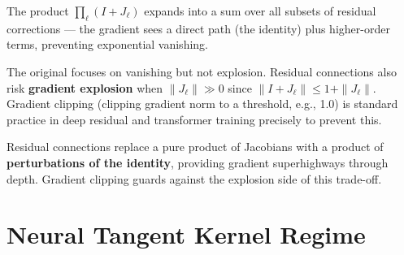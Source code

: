 \documentclass[12pt,a4paper]{article}
\theoremstyle{definition}
\theoremstyle{remark}
\begin{document}
The product $\prod_\ell(I + J_\ell)$ expands into a sum over all subsets of residual corrections — the gradient sees a direct path (the identity) plus higher-order terms, preventing exponential vanishing.

\begin{critbox}
The original focuses on vanishing but not explosion. Residual connections also risk \textbf{gradient explosion} when $\|J_\ell\| \gg 0$ since $\|I + J_\ell\| \le 1 + \|J_\ell\|$. Gradient clipping (clipping gradient norm to a threshold, e.g., 1.0) is standard practice in deep residual and transformer training precisely to prevent this.
\end{critbox}

\begin{keybox}
Residual connections replace a pure product of Jacobians with a product of \textbf{perturbations of the identity}, providing gradient superhighways through depth. Gradient clipping guards against the explosion side of this trade-off.
\end{keybox}

\begin{center}
\end{center}

\section{Neural Tangent Kernel Regime}
\end{document}
